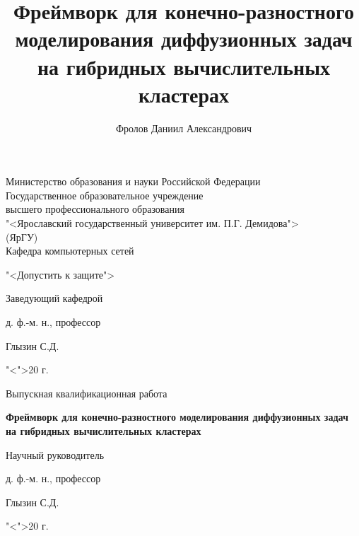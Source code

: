 \documentclass[a4paper, 14pt]{article}
\title{Фреймворк для конечно-разностного моделирования диффузионных задач на гибридных вычислительных кластерах}
\author{Фролов Даниил Александрович}
\theoremstyle{definition}
\begin{document}
\fontsize{14}{16pt}\selectfont

{
\thispagestyle{empty}

\begin{center}
	
	Министерство образования и науки Российской Федерации\\[0.3cm]
	Государственное образовательное учреждение\\
	высшего профессионального образования\\
	"<Ярославский государственный университет им. П.Г. Демидова">\\
	(ЯрГУ)\\[0.3cm]
	
	Кафедра компьютерных сетей
	
	\bigskip
	
	\hspace{15em}"<Допустить к защите">
	
	\begin{flushright}
		Заведующий кафедрой\par
		д. ф.-м. н., профессор\par
		\underline{\hspace{3.2cm}}Глызин С.Д.\par
		"<\underline{\hspace{0.5cm}}">\underline{\hspace{3.4cm}}20\underline{\hspace{0.5cm}} г.\par
	\end{flushright}
	
	\bigskip
	
	Выпускная квалификационная работа
	
	\bigskip
	
	{\LARGE\bf
		Фреймворк для конечно-разностного моделирования диффузионных задач на гибридных вычислительных кластерах 
	}
\end{center}

\medskip

\begin{flushright}
	Научный руководитель\par
	д. ф.-м. н., профессор\par
	\underline{\hspace{3.5cm}}Глызин С.Д.\par
	"<\underline{\hspace{0.8cm}}">\underline{\hspace{3.5cm}}20\underline{\hspace{0.5cm}} г.\par
\end{flushright}

}
\end{document}
